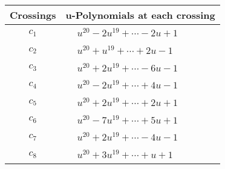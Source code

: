 \documentclass[1p]{elsarticle_modified}
\theoremstyle{definition}
\begin{document}
\begin{tabular}{m{50pt}|m{274pt}}
Crossings & \hspace{64pt}u-Polynomials at each crossing \\
\hline $$\begin{aligned}c_{1}\end{aligned}$$&$\begin{aligned}
&u^{20}-2 u^{19}+\cdots-2 u+1
\end{aligned}$\\
\hline $$\begin{aligned}c_{2}\end{aligned}$$&$\begin{aligned}
&u^{20}+u^{19}+\cdots+2 u-1
\end{aligned}$\\
\hline $$\begin{aligned}c_{3}\end{aligned}$$&$\begin{aligned}
&u^{20}+2 u^{19}+\cdots-6 u-1
\end{aligned}$\\
\hline $$\begin{aligned}c_{4}\end{aligned}$$&$\begin{aligned}
&u^{20}-2 u^{19}+\cdots+4 u-1
\end{aligned}$\\
\hline $$\begin{aligned}c_{5}\end{aligned}$$&$\begin{aligned}
&u^{20}+2 u^{19}+\cdots+2 u+1
\end{aligned}$\\
\hline $$\begin{aligned}c_{6}\end{aligned}$$&$\begin{aligned}
&u^{20}-7 u^{19}+\cdots+5 u+1
\end{aligned}$\\
\hline $$\begin{aligned}c_{7}\end{aligned}$$&$\begin{aligned}
&u^{20}+2 u^{19}+\cdots-4 u-1
\end{aligned}$\\
\hline $$\begin{aligned}c_{8}\end{aligned}$$&$\begin{aligned}
&u^{20}+3 u^{19}+\cdots+u+1
\end{aligned}$\\

\end{tabular}
\end{document}
